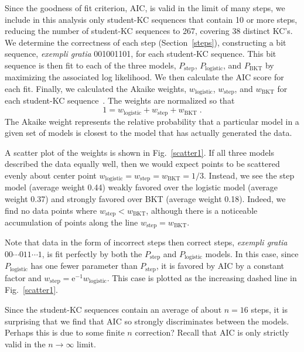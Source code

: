 \documentclass{edm_template}
\begin{document}
Since the goodness of fit criterion, AIC, is valid in the limit of
many steps, we include in this analysis only student-KC sequences that
contain 10 or more steps, reducing the number of student-KC sequences to
267, covering 38 distinct KC's.  We determine the correctness of each
step (Section~\ref{steps}), constructing a bit sequence, {\em exempli
gratia} 001001101, for each student-KC sequence.  This bit sequence is then
fit to each of the three models, $P_\mathrm{step}$,
$P_\mathrm{logistic}$, and $P_\mathrm{BKT}$ by maximizing the
associated log likelihood.
We then calculate the AIC score for each fit.  
Finally, we calculated the Akaike weights, $w_\mathrm{logistic}$, $w_\mathrm{step}$, and $w_\mathrm{BKT}$ for each student-KC sequence~\cite{burnham_model_2002}.
The weights are normalized so that
%
\begin{equation}
   1=w_\mathrm{logistic}+ w_\mathrm{step} + w_\mathrm{BKT} \; .
\end{equation}
%
The Akaike weight represents the relative probability that
a particular model in a given set of models is closest
to the model that has actually generated the data. 

A scatter plot of the weights is shown in Fig.~\ref{scatter1}.
If all three models described the data equally well, then
we would expect points to be scattered evenly about 
center point $w_\mathrm{logistic}= w_\mathrm{step}= w_\mathrm{BKT}=1/3$.
Instead, we see the step model (average weight 0.44) weakly 
favored over the logistic model (average weight 0.37) and 
strongly favored over BKT (average weight 0.18).  Indeed, we 
find no data points where $w_\mathrm{step}< w_\mathrm{BKT}$,
although there is a noticeable accumulation of points along the line 
$w_\mathrm{step}= w_\mathrm{BKT}$.

Note that data in the form of incorrect steps then correct steps, 
{\it exempli gratia} $00\cdots 011\cdots 1$,
is fit perfectly by both the $P_\mathrm{step}$ and 
$P_\mathrm{logistic}$ models.  
In this case, since $P_\mathrm{logistic}$ has one fewer parameter
than $P_\mathrm{step}$, it is favored by AIC by a constant factor and
$w_\mathrm{step}=\mathrm{e}^{-1} w_\mathrm{logistic}$.  This case is
plotted as the increasing dashed line in Fig.~\ref{scatter1}.

Since the student-KC sequences contain an average of about $n=16$ 
steps, it is surprising that we find that AIC so strongly
discriminates between the models.  Perhaps this is due to
some finite $n$ correction?  Recall that AIC is only 
strictly valid in the $n\to\infty$ limit.
\end{document}
